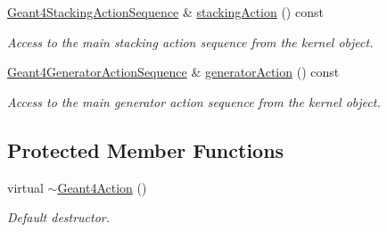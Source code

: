 \begin{DoxyCompactItemize}
\hyperlink{class_d_d4hep_1_1_simulation_1_1_geant4_stacking_action_sequence}{Geant4StackingActionSequence} \& \hyperlink{class_d_d4hep_1_1_simulation_1_1_geant4_action_a6b95f50c5be424298cd711510450c1c4}{stackingAction} () const 
\begin{DoxyCompactList}\small\item\em Access to the main stacking action sequence from the kernel object. \item\end{DoxyCompactList}\item 
\hyperlink{class_d_d4hep_1_1_simulation_1_1_geant4_generator_action_sequence}{Geant4GeneratorActionSequence} \& \hyperlink{class_d_d4hep_1_1_simulation_1_1_geant4_action_a9c9d5445811b06f67319a88df1288094}{generatorAction} () const 
\begin{DoxyCompactList}\small\item\em Access to the main generator action sequence from the kernel object. \item\end{DoxyCompactList}\end{DoxyCompactItemize}
\subsection*{Protected Member Functions}
\begin{DoxyCompactItemize}
\item 
virtual \hyperlink{class_d_d4hep_1_1_simulation_1_1_geant4_action_af1ba7438be6c70743727ce6606c5f76a}{$\sim$Geant4Action} ()
\begin{DoxyCompactList}\small\item\em Default destructor. \item\end{DoxyCompactList}\end{DoxyCompactItemize}
